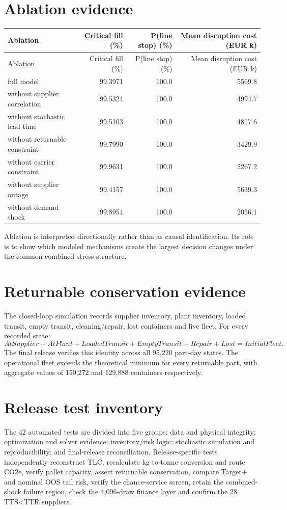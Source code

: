 \documentclass[11pt]{article}
\begin{document}
\section{Ablation evidence}
\begin{longtable}{lrrr}
\toprule
Ablation & Critical fill (\%) & P(line stop) (\%) & Mean disruption cost (EUR k) \\
\midrule
\endfirsthead
\toprule
Ablation & Critical fill (\%) & P(line stop) (\%) & Mean disruption cost (EUR k) \\
\midrule
\endhead
full model & 99.3971 & 100.0 & 5569.8 \\
without supplier correlation & 99.5324 & 100.0 & 4994.7 \\
without stochastic lead time & 99.5103 & 100.0 & 4817.6 \\
without returnable constraint & 99.7990 & 100.0 & 3429.9 \\
without carrier constraint & 99.9631 & 100.0 & 2267.2 \\
without supplier outage & 99.4157 & 100.0 & 5639.3 \\
without demand shock & 99.8954 & 100.0 & 2056.1 \\
\bottomrule
\end{longtable}
Ablation is interpreted directionally rather than as causal identification. Its role is to show which modeled mechanisms create the largest decision changes under the common combined-stress structure.

\section{Returnable conservation evidence}
The closed-loop simulation records supplier inventory, plant inventory, loaded transit, empty transit, cleaning/repair, lost containers and live fleet. For every recorded state:
\[
AtSupplier + AtPlant + LoadedTransit + EmptyTransit + Repair + Lost = InitialFleet.
\]
The final release verifies this identity across all 95,220 part-day states. The operational fleet exceeds the theoretical minimum for every returnable part, with aggregate values of 150,272 and 129,888 containers respectively.

\section{Release test inventory}
The 42 automated tests are divided into five groups: data and physical integrity; optimization and solver evidence; inventory/risk logic; stochastic simulation and reproducibility; and final-release reconciliation. Release-specific tests independently reconstruct TLC, recalculate kg-to-tonne conversion and route CO2e, verify pallet capacity, assert returnable conservation, compare Target+ and nominal OOS tail risk, verify the chance-service screen, retain the combined-shock failure region, check the 4,096-draw finance layer and confirm the 28 TTS<TTR suppliers.
\end{document}
